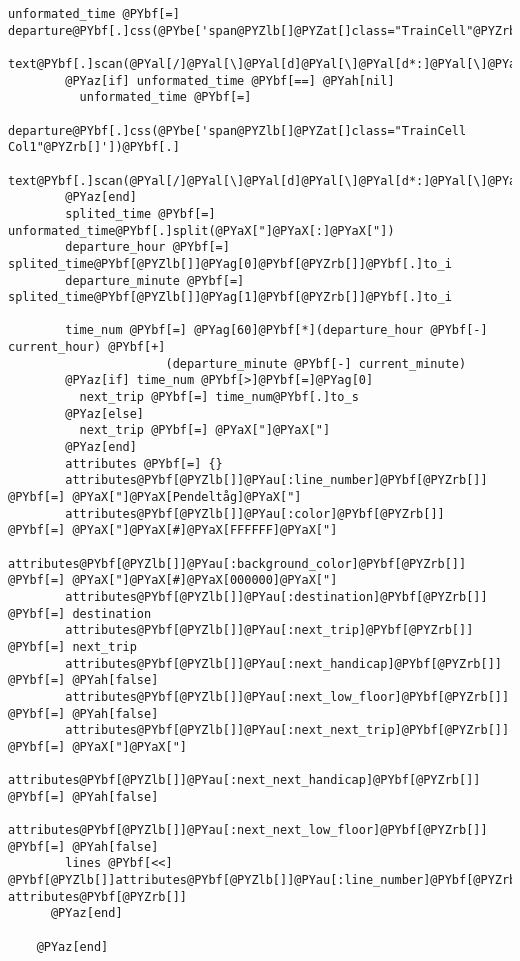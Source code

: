 \begin{Verbatim}[commandchars=@\[\]]
        unformated_time @PYbf[=] departure@PYbf[.]css(@PYbe['span@PYZlb[]@PYZat[]class="TrainCell"@PYZrb[]'])@PYbf[.]
          text@PYbf[.]scan(@PYal[/]@PYal[\]@PYal[d]@PYal[\]@PYal[d*:]@PYal[\]@PYal[d]@PYal[\]@PYal[d]@PYal[/])@PYbf[@PYZlb[]]@PYag[0]@PYbf[@PYZrb[]]
        @PYaz[if] unformated_time @PYbf[==] @PYah[nil]
          unformated_time @PYbf[=]
            departure@PYbf[.]css(@PYbe['span@PYZlb[]@PYZat[]class="TrainCell Col1"@PYZrb[]'])@PYbf[.]
              text@PYbf[.]scan(@PYal[/]@PYal[\]@PYal[d]@PYal[\]@PYal[d*:]@PYal[\]@PYal[d]@PYal[\]@PYal[d]@PYal[/])@PYbf[@PYZlb[]]@PYag[0]@PYbf[@PYZrb[]]
        @PYaz[end]
        splited_time @PYbf[=] unformated_time@PYbf[.]split(@PYaX["]@PYaX[:]@PYaX["])
        departure_hour @PYbf[=] splited_time@PYbf[@PYZlb[]]@PYag[0]@PYbf[@PYZrb[]]@PYbf[.]to_i
        departure_minute @PYbf[=] splited_time@PYbf[@PYZlb[]]@PYag[1]@PYbf[@PYZrb[]]@PYbf[.]to_i
        
        time_num @PYbf[=] @PYag[60]@PYbf[*](departure_hour @PYbf[-] current_hour) @PYbf[+]
                      (departure_minute @PYbf[-] current_minute)
        @PYaz[if] time_num @PYbf[>]@PYbf[=]@PYag[0]
          next_trip @PYbf[=] time_num@PYbf[.]to_s
        @PYaz[else]
          next_trip @PYbf[=] @PYaX["]@PYaX["]
        @PYaz[end]
        attributes @PYbf[=] {}
        attributes@PYbf[@PYZlb[]]@PYau[:line_number]@PYbf[@PYZrb[]]       @PYbf[=] @PYaX["]@PYaX[Pendeltåg]@PYaX["]
        attributes@PYbf[@PYZlb[]]@PYau[:color]@PYbf[@PYZrb[]]             @PYbf[=] @PYaX["]@PYaX[#]@PYaX[FFFFFF]@PYaX["]
        attributes@PYbf[@PYZlb[]]@PYau[:background_color]@PYbf[@PYZrb[]]  @PYbf[=] @PYaX["]@PYaX[#]@PYaX[000000]@PYaX["]
        attributes@PYbf[@PYZlb[]]@PYau[:destination]@PYbf[@PYZrb[]]       @PYbf[=] destination
        attributes@PYbf[@PYZlb[]]@PYau[:next_trip]@PYbf[@PYZrb[]]         @PYbf[=] next_trip
        attributes@PYbf[@PYZlb[]]@PYau[:next_handicap]@PYbf[@PYZrb[]]        @PYbf[=] @PYah[false]
        attributes@PYbf[@PYZlb[]]@PYau[:next_low_floor]@PYbf[@PYZrb[]]       @PYbf[=] @PYah[false]
        attributes@PYbf[@PYZlb[]]@PYau[:next_next_trip]@PYbf[@PYZrb[]]    @PYbf[=] @PYaX["]@PYaX["]
        attributes@PYbf[@PYZlb[]]@PYau[:next_next_handicap]@PYbf[@PYZrb[]]        @PYbf[=] @PYah[false]
        attributes@PYbf[@PYZlb[]]@PYau[:next_next_low_floor]@PYbf[@PYZrb[]]       @PYbf[=] @PYah[false]
        lines @PYbf[<<] @PYbf[@PYZlb[]]attributes@PYbf[@PYZlb[]]@PYau[:line_number]@PYbf[@PYZrb[]], attributes@PYbf[@PYZrb[]]
      @PYaz[end]
      
    @PYaz[end]
    

\end{Verbatim}
